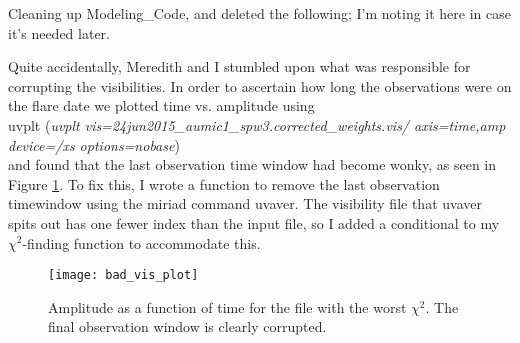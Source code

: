 \documentclass[a4paper]{tufte-handout}
\begin{document}
\hrulefill


Cleaning up Modeling\_Code, and deleted the following;
I'm noting it here in case it's needed later.\\


\hrulefill


Quite accidentally, Meredith and I stumbled upon what was responsible for corrupting the visibilities. In order to ascertain how long the observations were on the flare date we plotted time vs. amplitude using\\
uvplt (\textit{uvplt vis=24jun2015\_aumic1\_spw3.corrected\_weights.vis/ axis=time,amp device=/xs options=nobase})\\
and found that the last observation time window had become wonky, as seen in Figure \ref{fig:bad_vis}. To fix this, I wrote a function to remove the last observation timewindow using the miriad command uvaver. The visibility file that uvaver spits out has one fewer index than the input file, so I added a conditional to my $\chi^2$-finding function to accommodate this.

\begin{figure}[!ht]
	\label{fig:bad_vis}
	\centering
	\caption{Amplitude as a function of time for the file with the worst $\chi^2$. The final observation window is clearly corrupted.}

	\texttt{[image: bad\_vis\_plot]}
\end{figure}


\hrulefill

\end{document}
